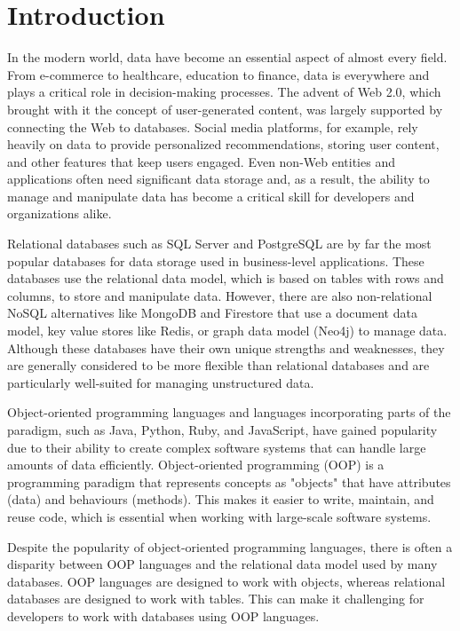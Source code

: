 \chapter{Introduction}

In the modern world, data have become an essential aspect of almost every field. From e-commerce to healthcare, education to finance, data is everywhere and plays a critical role in decision-making processes. The advent of Web 2.0, which brought with it the concept of user-generated content, was largely supported by connecting the Web to databases. Social media platforms, for example, rely heavily on data to provide personalized recommendations, storing user content, and other features that keep users engaged. Even non-Web entities and applications often need significant data storage and, as a result, the ability to manage and manipulate data has become a critical skill for developers and organizations alike.\par
Relational databases such as SQL Server and PostgreSQL are by far the most popular databases for data storage used in business-level applications. These databases use the relational data model, which is based on tables with rows and columns, to store and manipulate data. However, there are also non-relational NoSQL alternatives like MongoDB and Firestore that use a document data model, key value stores like Redis, or graph data model (Neo4j) to manage data. Although these databases have their own unique strengths and weaknesses, they are generally considered to be more flexible than relational databases and are particularly well-suited for managing unstructured data.\par
Object-oriented programming languages and languages incorporating parts of the paradigm, such as Java, Python, Ruby, and JavaScript, have gained popularity due to their ability to create complex software systems that can handle large amounts of data efficiently. Object-oriented programming (OOP) is a programming paradigm that represents concepts as "objects" that have attributes (data) and behaviours (methods). This makes it easier to write, maintain, and reuse code, which is essential when working with large-scale software systems.\par
Despite the popularity of object-oriented programming languages, there is often a disparity between OOP languages and the relational data model used by many databases. OOP languages are designed to work with objects, whereas relational databases are designed to work with tables. This can make it challenging for developers to work with databases using OOP languages. \par
